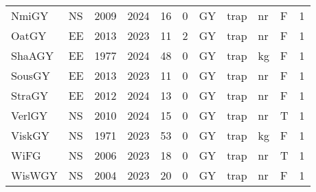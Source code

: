 \begin{table}[htbp]
\begin{tabular}{p{1cm}p{1cm}p{1cm}p{1cm}p{0.8cm}p{0.8cm}p{1cm}p{2cm}p{2cm}p{1cm}p{1cm}}
  NmiGY & NS & 2009 & 2024 & 16 & 0 & GY & trap & nr & F & 1 \\ 
  OatGY & EE & 2013 & 2023 & 11 & 2 & GY & trap & nr & F & 1 \\ 
  ShaAGY & EE & 1977 & 2024 & 48 & 0 & GY & trap & kg & F & 1 \\ 
  SousGY & EE & 2013 & 2023 & 11 & 0 & GY & trap & nr & F & 1 \\ 
  StraGY & EE & 2012 & 2024 & 13 & 0 & GY & trap & nr & F & 1 \\ 
  VerlGY & NS & 2010 & 2024 & 15 & 0 & GY & trap & nr & T & 1 \\ 
  ViskGY & NS & 1971 & 2023 & 53 & 0 & GY & trap & kg & F & 1 \\ 
  WiFG & NS & 2006 & 2023 & 18 & 0 & GY & trap & nr & T & 1 \\ 
  WisWGY & NS & 2004 & 2023 & 20 & 0 & GY & trap & nr & F & 1 \\ 
   \hline
\end{tabular}
\end{table}
